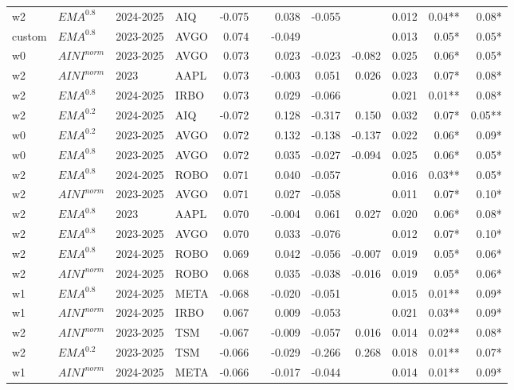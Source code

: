 {\begin{tabularx}{\textwidth}{@{}X@{\hspace{0.5pt}}X@{\hspace{0.5pt}}X@{\hspace{0.5pt}}X@{\hspace{2.0pt}} r r r r r r r r@{}}
w2 & $EMA^{0.8}$ & 2024-2025 & AIQ & -0.075 &  & 0.038 & -0.055 &  & 0.012 & 0.04** & 0.08* \\
custom & $EMA^{0.8}$ & 2023-2025 & AVGO & 0.074 &  & -0.049 &  &  & 0.013 & 0.05* & 0.05* \\
w0 & $AINI^{norm}$ & 2023-2025 & AVGO & 0.073 &  & 0.023 & -0.023 & -0.082 & 0.025 & 0.06* & 0.05* \\
w2 & $AINI^{norm}$ & 2023 & AAPL & 0.073 &  & -0.003 & 0.051 & 0.026 & 0.023 & 0.07* & 0.08* \\
w2 & $EMA^{0.8}$ & 2024-2025 & IRBO & 0.073 &  & 0.029 & -0.066 &  & 0.021 & 0.01** & 0.08* \\
w2 & $EMA^{0.2}$ & 2024-2025 & AIQ & -0.072 &  & 0.128 & -0.317 & 0.150 & 0.032 & 0.07* & 0.05** \\
w0 & $EMA^{0.2}$ & 2023-2025 & AVGO & 0.072 &  & 0.132 & -0.138 & -0.137 & 0.022 & 0.06* & 0.09* \\
w0 & $EMA^{0.8}$ & 2023-2025 & AVGO & 0.072 &  & 0.035 & -0.027 & -0.094 & 0.025 & 0.06* & 0.05* \\
w2 & $EMA^{0.8}$ & 2024-2025 & ROBO & 0.071 &  & 0.040 & -0.057 &  & 0.016 & 0.03** & 0.05* \\
w2 & $AINI^{norm}$ & 2023-2025 & AVGO & 0.071 &  & 0.027 & -0.058 &  & 0.011 & 0.07* & 0.10* \\
w2 & $EMA^{0.8}$ & 2023 & AAPL & 0.070 &  & -0.004 & 0.061 & 0.027 & 0.020 & 0.06* & 0.08* \\
w2 & $EMA^{0.8}$ & 2023-2025 & AVGO & 0.070 &  & 0.033 & -0.076 &  & 0.012 & 0.07* & 0.10* \\
w2 & $EMA^{0.8}$ & 2024-2025 & ROBO & 0.069 &  & 0.042 & -0.056 & -0.007 & 0.019 & 0.05* & 0.06* \\
w2 & $AINI^{norm}$ & 2024-2025 & ROBO & 0.068 &  & 0.035 & -0.038 & -0.016 & 0.019 & 0.05* & 0.06* \\
w1 & $EMA^{0.8}$ & 2024-2025 & META & -0.068 &  & -0.020 & -0.051 &  & 0.015 & 0.01** & 0.09* \\
w1 & $AINI^{norm}$ & 2024-2025 & IRBO & 0.067 &  & 0.009 & -0.053 &  & 0.021 & 0.03** & 0.09* \\
w2 & $AINI^{norm}$ & 2023-2025 & TSM & -0.067 &  & -0.009 & -0.057 & 0.016 & 0.014 & 0.02** & 0.08* \\
w2 & $EMA^{0.2}$ & 2023-2025 & TSM & -0.066 &  & -0.029 & -0.266 & 0.268 & 0.018 & 0.01** & 0.07* \\
w1 & $AINI^{norm}$ & 2024-2025 & META & -0.066 &  & -0.017 & -0.044 &  & 0.014 & 0.01** & 0.09* \\

\end{tabularx}}
